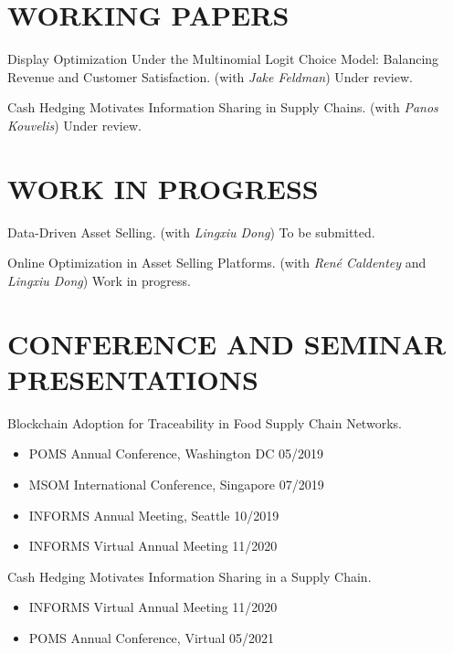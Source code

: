 \documentclass[margin, 10pt]{res} %
\begin{document}
\begin{resume}
\section{WORKING PAPERS}
Display Optimization Under the Multinomial Logit Choice Model: Balancing Revenue and Customer Satisfaction. (with {\it Jake Feldman})
Under review.

Cash Hedging Motivates Information Sharing in Supply Chains. (with {\it Panos Kouvelis})
Under review.

\section{WORK IN PROGRESS}
Data-Driven Asset Selling. (with {\it Lingxiu Dong})
To be submitted. 

Online Optimization in Asset Selling Platforms. (with {\it Ren\'{e} Caldentey} and {\it Lingxiu Dong})
Work in progress.


\section{CONFERENCE AND SEMINAR PRESENTATIONS}
Blockchain Adoption for Traceability in Food Supply Chain Networks.

\begin{itemize}
    \item POMS Annual Conference, Washington DC \hfill 05/2019
    \item MSOM International Conference, Singapore \hfill 07/2019
    \item INFORMS Annual Meeting, Seattle \hfill 10/2019
    \item INFORMS Virtual Annual Meeting \hfill 11/2020
\end{itemize}

Cash Hedging Motivates Information Sharing in a Supply Chain.

\begin{itemize}
    \item INFORMS Virtual Annual Meeting \hfill 11/2020
    \item POMS Annual Conference, Virtual \hfill 05/2021
\end{itemize}


\end{resume}
\end{document}
